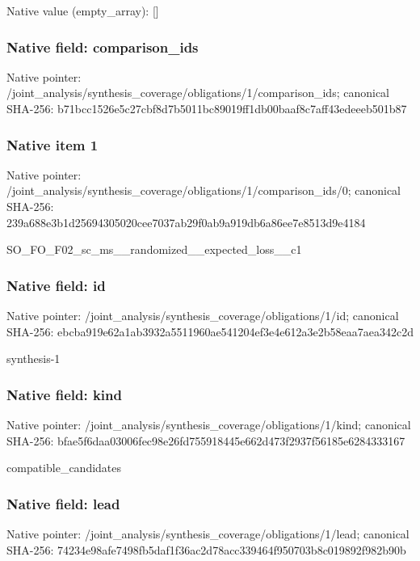 \documentclass[10pt,a4paper]{article}
\begin{document}
Native value (empty\_\allowbreak{}array): []

\subsubsection{Native field: comparison\_\allowbreak{}ids}
Native pointer: /joint\_\allowbreak{}analysis/synthesis\_\allowbreak{}coverage/obligations/1/comparison\_\allowbreak{}ids; canonical SHA-256: b71bcc1526e5c27cbf8d7b5011bc89019ff1db00baaf8c7aff43edeeeb501b87

\subsubsection{Native item 1}
Native pointer: /joint\_\allowbreak{}analysis/synthesis\_\allowbreak{}coverage/obligations/1/comparison\_\allowbreak{}ids/0; canonical SHA-256: 239a688e3b1d25694305020cee7037ab29f0ab9a919db6a86ee7e8513d9e4184

\begingroup\raggedright\sloppy SO\_\allowbreak{}FO\_\allowbreak{}F02\_\allowbreak{}sc\_\allowbreak{}ms\_\allowbreak{}\_\allowbreak{}randomized\_\allowbreak{}\_\allowbreak{}expected\_\allowbreak{}loss\_\allowbreak{}\_\allowbreak{}c1\par\endgroup

\subsubsection{Native field: id}
Native pointer: /joint\_\allowbreak{}analysis/synthesis\_\allowbreak{}coverage/obligations/1/id; canonical SHA-256: ebcba919e62a1ab3932a5511960ae541204ef3e4e612a3e2b58eaa7aea342c2d

\begingroup\raggedright\sloppy synthesis-1\par\endgroup

\subsubsection{Native field: kind}
Native pointer: /joint\_\allowbreak{}analysis/synthesis\_\allowbreak{}coverage/obligations/1/kind; canonical SHA-256: bfae5f6daa03006fec98e26fd755918445e662d473f2937f56185e6284333167

\begingroup\raggedright\sloppy compatible\_\allowbreak{}candidates\par\endgroup

\subsubsection{Native field: lead}
Native pointer: /joint\_\allowbreak{}analysis/synthesis\_\allowbreak{}coverage/obligations/1/lead; canonical SHA-256: 74234e98afe7498fb5daf1f36ac2d78acc339464f950703b8c019892f982b90b
\end{document}
